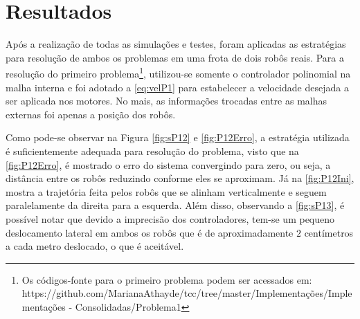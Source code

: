 \chapter{Resultados }
\label{chap:resultados}

Após a realização de todas as simulações e testes, foram aplicadas as estratégias para resolução de ambos os problemas em uma frota de dois robôs reais. Para a resolução do primeiro problema\footnote{Os códigos-fonte para o primeiro problema podem ser acessados em: https://github.com/MarianaAthayde/tcc/tree/master/Implementações/Implementações - Consolidadas/Problema1}, utilizou-se somente o controlador polinomial na malha interna e foi adotado a \autoref{eq:velP1} para estabelecer a velocidade desejada a ser aplicada nos motores. No mais, as informações trocadas entre as malhas externas foi apenas a posição dos robôs. 

Como pode-se observar na Figura \ref{fig:sP12} e \ref{fig:P12Erro}, a estratégia utilizada é suficientemente adequada para resolução do problema, visto que na \autoref{fig:P12Erro}, é mostrado o erro do sistema convergindo para zero, ou seja, a distância entre os robôs reduzindo conforme eles se aproximam. Já na \autoref{fig:P12Ini}, mostra a trajetória feita pelos robôs que se alinham verticalmente e seguem paralelamente da direita para a esquerda. Além disso, observando a \autoref{fig:sP13}, é possível notar que devido a imprecisão dos controladores, tem-se um pequeno deslocamento lateral em ambos os robôs que é de aproximadamente $2$ centímetros a cada metro deslocado, o que é aceitável.

